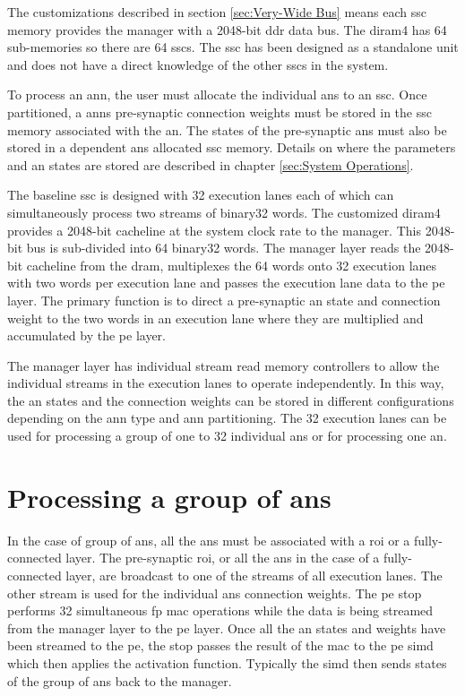 The customizations described in section \ref{sec:Very-Wide Bus} means each \ac{ssc} memory provides the manager with a 2048-bit \ac{ddr} data bus.
The \ac{diram4} has 64 sub-memories so there are 64 \acp{ssc}. The \ac{ssc} has been designed as a standalone unit and does not have a direct knowledge of the other \acp{ssc} in the system.

To process an \ac{ann}, the user must allocate the individual \acp{an} to an \ac{ssc}. Once partitioned, a \acp{ann} pre-synaptic connection weights must be stored in the \ac{ssc} memory associated with the \ac{an}.
The states of the pre-synaptic \acp{an} must also be stored in a dependent \acp{an} allocated \ac{ssc} memory.
Details on where the parameters and \ac{an} states are stored are described in chapter \ref{sec:System Operations}.

The baseline \ac{ssc} is designed with 32 execution lanes each of which can simultaneously process two streams of \ac{binary32} words.
The customized \ac{diram4} provides a 2048-bit cacheline at the system clock rate to the manager. This 2048-bit bus is sub-divided into 64 \ac{binary32} words.
The manager layer reads the 2048-bit cacheline from the \ac{dram}, multiplexes the 64 words onto 32 execution lanes with two words per execution lane and passes the execution lane data to the \ac{pe} layer.
The primary function is to direct a pre-synaptic \ac{an} state and connection weight to the two words in an execution lane where they are multiplied and accumulated by the \ac{pe} layer.

The manager layer has individual stream read memory controllers to allow the individual streams in the execution lanes to operate independently.
In this way, the \ac{an} states and the connection weights can be stored in different configurations depending on the \ac{ann} type and \ac{ann} partitioning.
The 32 execution lanes can be used for processing a group of one to 32 individual \acp{an} or for processing one \ac{an}.

\section{Processing a group of \acp{an}}
\label{sec:Processing a group of ANes}

In the case of group of \acp{an}, all the \acp{an} must be associated with a \ac{roi} or a fully-connected layer.
The pre-synaptic \ac{roi}, or all the \acp{an} in the case of a fully-connected layer, are broadcast to one of the streams of all execution lanes.
The other stream is used for the individual \acp{an} connection weights. 
The \ac{pe} \ac{stop} performs 32 simultaneous \acf{fp} \ac{mac} operations while the data is being streamed from the manager layer to the \ac{pe} layer.
Once all the \ac{an} states and weights have been streamed to the \ac{pe}, the \ac{stop} passes the result of the \ac{mac} to the \ac{pe} \ac{simd} which then applies the activation function.
Typically the \ac{simd} then sends states of the group of \acp{an} back to the manager.

